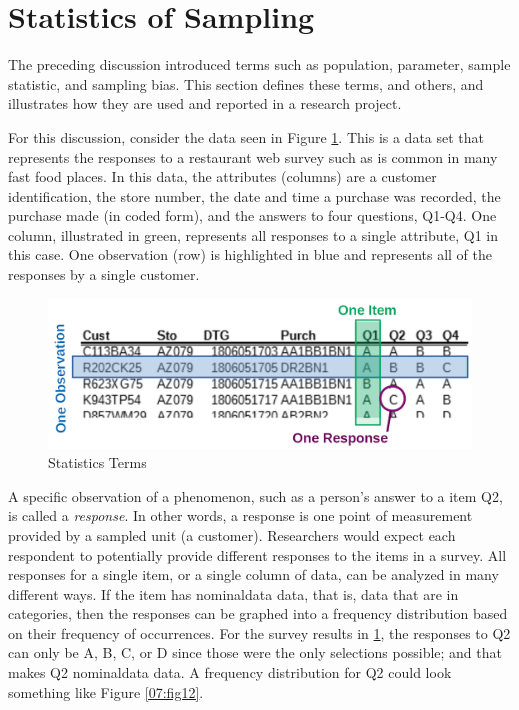 \section{Statistics of Sampling}

The preceding discussion introduced terms such as population, parameter, sample statistic, and sampling bias. This section defines these terms, and others, and illustrates how they are used and reported in a research project.

For this discussion, consider the data seen in Figure \ref{07:fig10}. This is a data set that represents the responses to a restaurant web survey such as is common in many fast food places. In this data, the attributes (columns) are a customer identification, the store number, the date and time a purchase was recorded, the purchase made (in coded form), and the answers to four questions, Q1-Q4. One column, illustrated in green, represents all responses to a single attribute, Q1 in this case. One observation (row) is highlighted in blue and represents all of the responses by a single customer.

\begin{figure}[H]
	\centering
	\includegraphics[]{gfx/07-10}
	\caption{Statistics Terms}
	\label{07:fig10}
\end{figure}

A specific observation of a phenomenon, such as a person's answer to a item Q2, is called a \textit{response}. In other words, a response is one point of measurement provided by a sampled unit (a customer). Researchers would expect each respondent to potentially provide different responses to the items in a survey. All responses for a single item, or a single column of data, can be analyzed in many different ways. If the item has \gls{nominaldata} data, that is, data that are in categories, then the responses can be graphed into a frequency distribution based on their frequency of occurrences. For the survey results in \ref{07:fig10}, the responses to Q2 can only be A, B, C, or D since those were the only selections possible; and that makes Q2 \gls{nominaldata} data. A frequency distribution for Q2 could look something like Figure \ref{07:fig12}.

